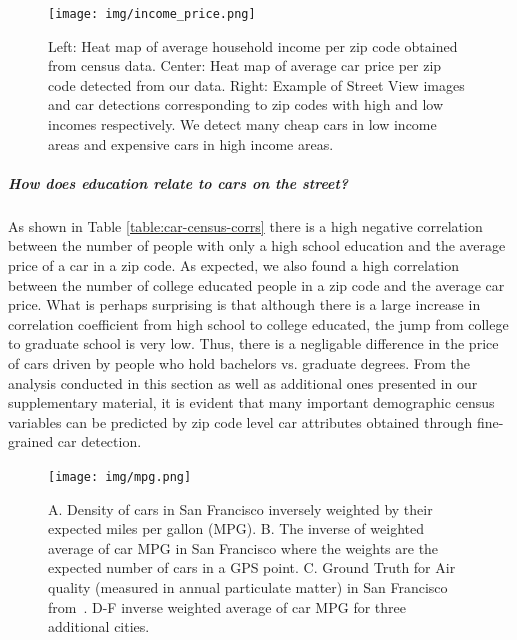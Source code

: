 \documentclass[10pt,twocolumn,letterpaper]{article}
\begin{document}
\begin{figure}[t]
\begin{center}
    \texttt{[image: img/income\_price.png]}
\end{center}
   \caption {Left: Heat map of average household income per zip code obtained from census data. Center: Heat map of average car price per zip code detected from our data. Right: Example of Street View images and car detections corresponding to zip codes with high and low incomes respectively. We detect many cheap cars in low income areas and expensive cars in high income areas.}
\label{fig:bos-sf-vis}
\end{figure}
\subparagraph{How does education relate to cars on the street?}
As shown in Table \ref{table:car-census-corrs} there is a high negative correlation between the number of people with only a high school education and the average price of a car in a zip code. As expected, we also found a high correlation between the number of college educated people in a zip code and the average car price. What is perhaps surprising is that although there is a large increase in correlation coefficient from high school to college educated, the jump from college to graduate school is very low. Thus, there is a negligable difference in the price of cars driven by people who hold bachelors vs. graduate degrees. From the analysis conducted in this section as well as additional ones presented in our supplementary material, it is evident that many important demographic census variables can be predicted by zip code level car attributes obtained through fine-grained car detection.

\begin{figure}[t]
\begin{center}
    \texttt{[image: img/mpg.png]}
\end{center}
   \caption { A. Density of cars in San Francisco inversely weighted by their expected miles per gallon (MPG). B. The inverse of weighted average of car MPG in San Francisco where the weights are the expected number of cars in a GPS point. C. Ground Truth for Air quality (measured in annual particulate matter) in San Francisco from~\cite{ground_air}. D-F inverse weighted average of car MPG for three additional cities.}
\label{fig:pollution}
\end{figure}
\end{document}
